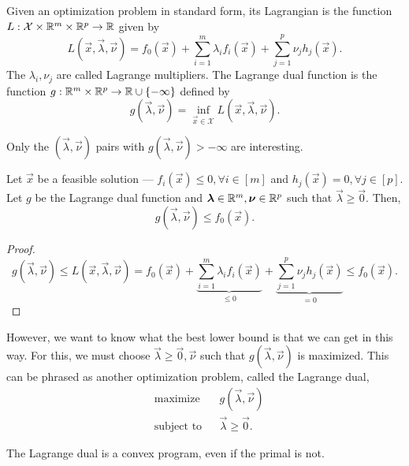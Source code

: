 \begin{definition}
    Given an optimization problem in standard form, its Lagrangian is the function $L: \mathcal{X} \times \mathbb{R}^m \times \mathbb{R}^p \to \mathbb{R}$ given by \[
        L(\vec{x},\vec{\lambda},\vec{\nu}) = f_0(\vec{x}) + \sum_{i=1}^{m} \lambda_i f_i(\vec{x}) + \sum_{j=1}^{p} \nu_j h_j(\vec{x}).
    \]
    The $\lambda_i,\nu_j$ are called Lagrange multipliers. The Lagrange dual function is the function
    $g: \mathbb{R}^m \times \mathbb{R}^p \to \mathbb{R} \cup \{ -\infty \}$ defined by \[
        g(\vec{\lambda},\vec{\nu}) = \inf_{\vec{x}\in \mathcal{X}} L(\vec{x},\vec{\lambda},\vec{\nu}).
    \]
\end{definition}

Only the $(\vec{\lambda},\vec{\nu})$ pairs with $g(\vec{\lambda},\vec{\nu}) > -\infty$ are
interesting.

\begin{lemma}
    Let $\vec{x}$ be a feasible solution --- $f_i(\vec{x}) \leq 0, \forall i \in [m]$ and $h_j(\vec{x})
        = 0, \forall j \in [p]$. Let $g$ be the Lagrange dual function and $\bm{\lambda}\in \mathbb{R}^m,
        \bm{\nu}\in \mathbb{R}^p$ such that $\vec{\lambda} \geq \vec{0}$. Then, \[
        g(\vec{\lambda},\vec{\nu}) \leq f_0(\vec{x}).
    \]
\end{lemma}

\begin{proof}
    \[
        g(\vec{\lambda},\vec{\nu}) \leq L(\vec{x},\vec{\lambda},\vec{\nu}) = f_0(\vec{x}) + \underbrace{\sum_{i=1}^{m} \lambda_i f_i(\vec{x})}_{\leq 0} + \underbrace{\sum_{j=1}^{p} \nu_j h_j(\vec{x})}_{=0} \leq f_0(\vec{x}).
    \]
\end{proof}

However, we want to know what the best lower bound is that we can get in this way. For this, we
must choose $\vec{\lambda} \geq \vec{0}, \vec{\nu}$ such that $g(\vec{\lambda},\vec{\nu})$ is
maximized. This can be phrased as another optimization problem, called the Lagrange dual, \[
    \begin{aligned}
         & \text{maximize}   &  & g(\vec{\lambda},\vec{\nu})  \\
         & \text{subject to} &  & \vec{\lambda} \geq \vec{0}.
    \end{aligned}
\]

\begin{corollary}
    The Lagrange dual is a convex program, even if the primal is not.
\end{corollary}


